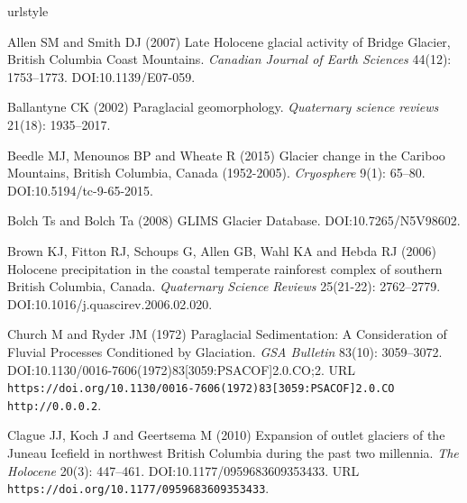 \documentclass[Royal,times,doublespace,sageh]{sagej}
\begin{document}
\pagebreak


\begin{thebibliography}{69}
\providecommand{\natexlab}[1]{#1}
\providecommand{\url}[1]{\texttt{#1}}
\providecommand{\urlprefix}{URL }
\expandafter\ifx\csname urlstyle\endcsname\relax
  \providecommand{\doi}[1]{DOI:\discretionary{}{}{}#1}\else
  \providecommand{\doi}{DOI:\discretionary{}{}{}\begingroup
  \urlstyle{rm}\Url}\fi

Allen SM and Smith DJ (2007) {Late Holocene glacial activity of Bridge Glacier,
  British Columbia Coast Mountains}.
\newblock \emph{Canadian Journal of Earth Sciences} 44(12): 1753--1773.
\newblock \doi{10.1139/E07-059}.

Ballantyne CK (2002) {Paraglacial geomorphology}.
\newblock \emph{Quaternary science reviews} 21(18): 1935--2017.

Beedle MJ, Menounos BP and Wheate R (2015) {Glacier change in the Cariboo
  Mountains, British Columbia, Canada (1952-2005)}.
\newblock \emph{Cryosphere} 9(1): 65--80.
\newblock \doi{10.5194/tc-9-65-2015}.

Bolch Ts and Bolch Ta (2008) {GLIMS Glacier Database}.
\newblock \doi{10.7265/N5V98602}.

Brown KJ, Fitton RJ, Schoups G, Allen GB, Wahl KA and Hebda RJ (2006) {Holocene
  precipitation in the coastal temperate rainforest complex of southern British
  Columbia, Canada}.
\newblock \emph{Quaternary Science Reviews} 25(21-22): 2762--2779.
\newblock \doi{10.1016/j.quascirev.2006.02.020}.

Church M and Ryder JM (1972) {Paraglacial Sedimentation: A Consideration of
  Fluvial Processes Conditioned by Glaciation}.
\newblock \emph{GSA Bulletin} 83(10): 3059--3072.
\newblock \doi{10.1130/0016-7606(1972)83[3059:PSACOF]2.0.CO;2}.
\newblock
  \urlprefix\url{https://doi.org/10.1130/0016-7606(1972)83[3059:PSACOF]2.0.CO
  http://0.0.0.2}.

Clague JJ, Koch J and Geertsema M (2010) {Expansion of outlet glaciers of the
  Juneau Icefield in northwest British Columbia during the past two millennia}.
\newblock \emph{The Holocene} 20(3): 447--461.
\newblock \doi{10.1177/0959683609353433}.
\newblock \urlprefix\url{https://doi.org/10.1177/0959683609353433}.


\end{thebibliography}
\end{document}
